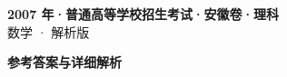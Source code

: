 \documentclass[zihao=-4, a4paper]{ctexart}
\begin{document}
\begin{center}
  {\Large\bfseries 2007 年·普通高等学校招生考试·安徽卷·理科}\\[4pt]
  {\large 数学 · 解析版}
\end{center}
\medskip
{}

\clearpage
{}
\begin{center}{\Large\bfseries 参考答案与详细解析}\end{center}
\medskip

\end{document}
